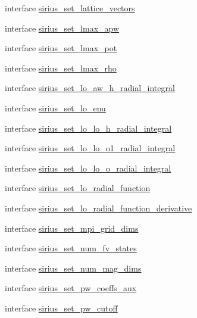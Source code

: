 \begin{DoxyCompactItemize}
\item 
interface \hyperlink{interfacesirius_1_1sirius__set__lattice__vectors}{sirius\+\_\+set\+\_\+lattice\+\_\+vectors}
\item 
interface \hyperlink{interfacesirius_1_1sirius__set__lmax__apw}{sirius\+\_\+set\+\_\+lmax\+\_\+apw}
\item 
interface \hyperlink{interfacesirius_1_1sirius__set__lmax__pot}{sirius\+\_\+set\+\_\+lmax\+\_\+pot}
\item 
interface \hyperlink{interfacesirius_1_1sirius__set__lmax__rho}{sirius\+\_\+set\+\_\+lmax\+\_\+rho}
\item 
interface \hyperlink{interfacesirius_1_1sirius__set__lo__aw__h__radial__integral}{sirius\+\_\+set\+\_\+lo\+\_\+aw\+\_\+h\+\_\+radial\+\_\+integral}
\item 
interface \hyperlink{interfacesirius_1_1sirius__set__lo__enu}{sirius\+\_\+set\+\_\+lo\+\_\+enu}
\item 
interface \hyperlink{interfacesirius_1_1sirius__set__lo__lo__h__radial__integral}{sirius\+\_\+set\+\_\+lo\+\_\+lo\+\_\+h\+\_\+radial\+\_\+integral}
\item 
interface \hyperlink{interfacesirius_1_1sirius__set__lo__lo__o1__radial__integral}{sirius\+\_\+set\+\_\+lo\+\_\+lo\+\_\+o1\+\_\+radial\+\_\+integral}
\item 
interface \hyperlink{interfacesirius_1_1sirius__set__lo__lo__o__radial__integral}{sirius\+\_\+set\+\_\+lo\+\_\+lo\+\_\+o\+\_\+radial\+\_\+integral}
\item 
interface \hyperlink{interfacesirius_1_1sirius__set__lo__radial__function}{sirius\+\_\+set\+\_\+lo\+\_\+radial\+\_\+function}
\item 
interface \hyperlink{interfacesirius_1_1sirius__set__lo__radial__function__derivative}{sirius\+\_\+set\+\_\+lo\+\_\+radial\+\_\+function\+\_\+derivative}
\item 
interface \hyperlink{interfacesirius_1_1sirius__set__mpi__grid__dims}{sirius\+\_\+set\+\_\+mpi\+\_\+grid\+\_\+dims}
\item 
interface \hyperlink{interfacesirius_1_1sirius__set__num__fv__states}{sirius\+\_\+set\+\_\+num\+\_\+fv\+\_\+states}
\item 
interface \hyperlink{interfacesirius_1_1sirius__set__num__mag__dims}{sirius\+\_\+set\+\_\+num\+\_\+mag\+\_\+dims}
\item 
interface \hyperlink{interfacesirius_1_1sirius__set__pw__coeffs__aux}{sirius\+\_\+set\+\_\+pw\+\_\+coeffs\+\_\+aux}
\item 
interface \hyperlink{interfacesirius_1_1sirius__set__pw__cutoff}{sirius\+\_\+set\+\_\+pw\+\_\+cutoff}

\end{DoxyCompactItemize}
